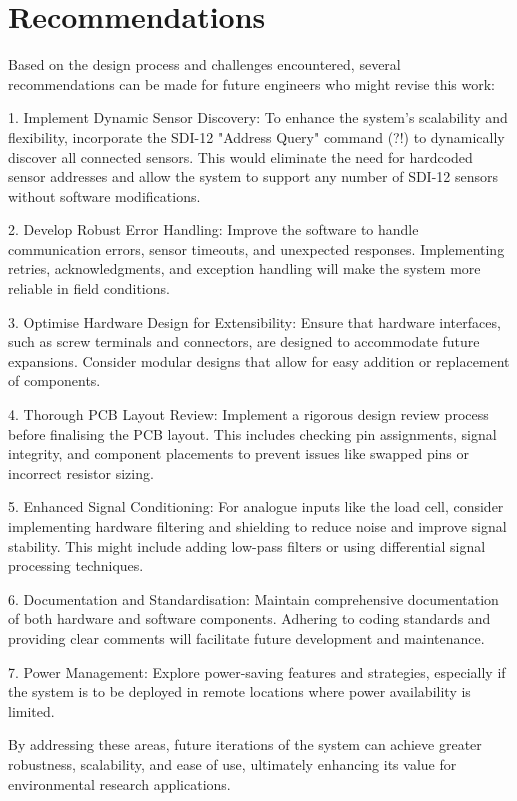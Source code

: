 \section{Recommendations}

Based on the design process and challenges encountered, several recommendations can be made for future engineers who might revise this work:

1. Implement Dynamic Sensor Discovery: To enhance the system's scalability and flexibility, incorporate the SDI-12 "Address Query" command (?!) to dynamically discover all connected sensors. This would eliminate the need for hardcoded sensor addresses and allow the system to support any number of SDI-12 sensors without software modifications.

2. Develop Robust Error Handling: Improve the software to handle communication errors, sensor timeouts, and unexpected responses. Implementing retries, acknowledgments, and exception handling will make the system more reliable in field conditions.

3. Optimise Hardware Design for Extensibility: Ensure that hardware interfaces, such as screw terminals and connectors, are designed to accommodate future expansions. Consider modular designs that allow for easy addition or replacement of components.

4. Thorough PCB Layout Review: Implement a rigorous design review process before finalising the PCB layout. This includes checking pin assignments, signal integrity, and component placements to prevent issues like swapped pins or incorrect resistor sizing.

5. Enhanced Signal Conditioning: For analogue inputs like the load cell, consider implementing hardware filtering and shielding to reduce noise and improve signal stability. This might include adding low-pass filters or using differential signal processing techniques.

6. Documentation and Standardisation: Maintain comprehensive documentation of both hardware and software components. Adhering to coding standards and providing clear comments will facilitate future development and maintenance.

7. Power Management: Explore power-saving features and strategies, especially if the system is to be deployed in remote locations where power availability is limited.

By addressing these areas, future iterations of the system can achieve greater robustness, scalability, and ease of use, ultimately enhancing its value for environmental research applications.